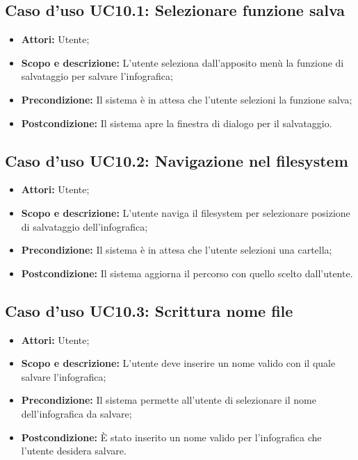 \subsection{Caso d'uso UC10.1: Selezionare funzione salva}
\begin{itemize}
	\item \textbf{Attori:} Utente;
	\item \textbf{Scopo e descrizione:} L'utente seleziona dall'apposito menù la funzione di salvataggio per salvare l'\gls{infografica};
	\item \textbf{Precondizione:} Il sistema è in attesa che l'utente selezioni la funzione salva;
	\item \textbf{Postcondizione:} Il sistema apre la finestra di dialogo per il salvataggio.
\end{itemize}

\subsection{Caso d'uso UC10.2: Navigazione nel filesystem}
\begin{itemize}
	\item \textbf{Attori:} Utente;
	\item \textbf{Scopo e descrizione:} L'utente naviga il \gls{filesystem} per selezionare posizione di salvataggio dell'\gls{infografica};
	\item \textbf{Precondizione:} Il sistema è in attesa che l'utente selezioni una cartella;
	\item \textbf{Postcondizione:} Il sistema aggiorna il percorso con quello scelto dall'utente.
\end{itemize}

\subsection{Caso d'uso UC10.3: Scrittura nome file}
\begin{itemize}
	\item \textbf{Attori:} Utente;
	\item \textbf{Scopo e descrizione:} L'utente deve inserire un nome valido con il quale salvare l'\gls{infografica};
	\item \textbf{Precondizione:} Il sistema permette all'utente di selezionare il nome dell'\gls{infografica} da salvare;
	\item \textbf{Postcondizione:} È stato inserito un nome valido per l'\gls{infografica} che l'utente desidera salvare.
\end{itemize}

